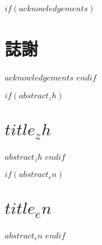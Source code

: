 \documentclass[$if(fontsize)$$fontsize$,$endif$$if(lang)$$babel-lang$,$endif$$if(papersize)$$papersize$paper,$endif$$for(classoption)$$classoption$$sep$,$endfor$]{$documentclass$}
\def\LARGE{\fontsize{20}{30}\selectfont}  %
\def\large{\fontsize{16}{20}\selectfont}  %
\renewcommand{\baselinestretch}{1.5}
\begin{document}
\newcommand\frontmatter{
    \cleardoublepage
    \pagenumbering{roman}
}

\newcommand\mainmatter{
    \cleardoublepage
    \pagenumbering{arabic}
}

\newcommand\backmatter{
    \if@openright
        \cleardoublepage
    \else
        \clearpage
    \fi
}

\frontmatter

$if(acknowledgements)$
\renewcommand{\abstractname}{\LARGE \center 誌謝}
\chapter*{誌謝}
\fontsize{14}{21}\selectfont\par{$acknowledgements$}
$endif$

$if(abstract_zh)$
\renewcommand{\abstractname}{\LARGE\center 摘要}
\chapter*{\normalfont $title_zh$}
\begin{center}
\large\selectfont{
    研究生：$author_zh$\par
    指導教授：$advisor_zh$\par
}
\vspace{1cm}
\fontsize{20}{30}
\end{center}
\renewcommand{\baselinestretch}{2}
\fontsize{14}{21}\selectfont\par{$abstract_zh$}
\renewcommand{\baselinestretch}{1.5}
$endif$

$if(abstract_en)$
\renewcommand{\abstractname}{\LARGE\center Abstract}
\chapter*{\normalfont $title_en$}
\begin{center}
\large\selectfont{
    Student: $author_en$\par
    Advisor: $advisor_en$\par
}
\vspace{1cm}
\fontsize{20}{30}
\end{center}
\vspace{0.5cm}
\fontsize{14}{21}\selectfont\par{$abstract_en$}
$endif$
\end{document}
